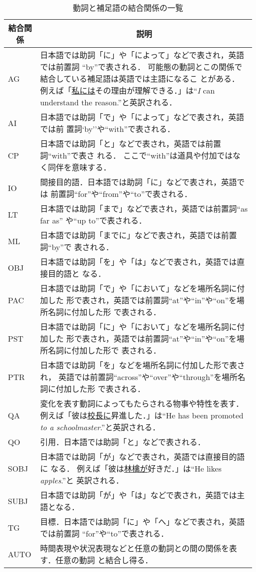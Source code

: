 \begin{table}[tbhp]
\caption{動詞と補足語の結合関係の一覧}
\label{tab:case}
\begin{center}
\begin{tabular}{|l||p{}|}\hline 
\multicolumn{1}{|c||}{結合関係}&\multicolumn{1}{c|}{説明}
\\\hline\hline
AG & 日本語では助詞「に」や「によって」などで表され，英語では前置詞
``by''で表される．
可能態の動詞とこの関係で結合している補足語は英語では主語になるこ
とがある．
例えば「\underline{私には}その理由が理解できる．」は``{\it I}
can understand the reason.''と英訳される．
\\\hline
AI & 日本語では助詞「で」や「によって」などで表され，英語では前
置詞`by''や``with''で表される．\\\hline
CP & 日本語では助詞「と」などで表され，英語では前置詞``with''で表さ
れる．
ここで``with''は道具や付加ではなく同伴を意味する．\\\hline
IO & 間接目的語．日本語では助詞「に」などで表され，英語では
前置詞``for''や``from''や``to''で表される．\\\hline
LT & 日本語では助詞「まで」などで表され，英語では前置詞``as far as''
や``up to''で表される．\\\hline
ML & 日本語では助詞「までに」などで表され，英語では前置詞``by''で
表される．\\\hline
OBJ & 日本語では助詞「を」や「は」などで表され，英語では直接目的語と
なる．
\\\hline
PAC & 日本語では助詞「で」や「において」などを場所名詞に付加した
形で表され，英語では前置詞``at''や``in''や``on''を場所名詞に付加した形
で表される．\\\hline
PST & 日本語では助詞「に」や「において」などを場所名詞に付加した
形で表され，英語では前置詞``at''や``in''や``on''を場所名詞に付加した形で
表される．\\\hline
PTR & 日本語では助詞「を」などを場所名詞に付加した形で表され，
英語では前置詞``across''や``over''や``through''を場所名詞に付加した形
で表される．\\\hline
QA & 変化を表す動詞によってもたらされる物事や特性を表す．
例えば「彼は\underline{校長に}昇進した．」は``He has been promoted 
{\it to a schoolmaster}.''と英訳される．
\\\hline
QO & 引用．日本語では助詞「と」などで表される．\\\hline
SOBJ & 日本語では助詞「が」などで表され，英語では直接目的語に
なる．
例えば「彼は\underline{林檎が}好きだ．」は``He likes {\it apples}.''と
英訳される．
\\\hline
SUBJ &  日本語では助詞「が」や「は」などで表され，英語では主語となる．
\\\hline
TG & 目標．日本語では助詞「に」や「へ」などで表され，英語では前置詞
``for''や``to''で表される．\\\hline
AUTO & 時間表現や状況表現などと任意の動詞との間の関係を表す．任意の動詞
と結合し得る．\\\hline
\end{tabular}
\end{center}
\end{table}

